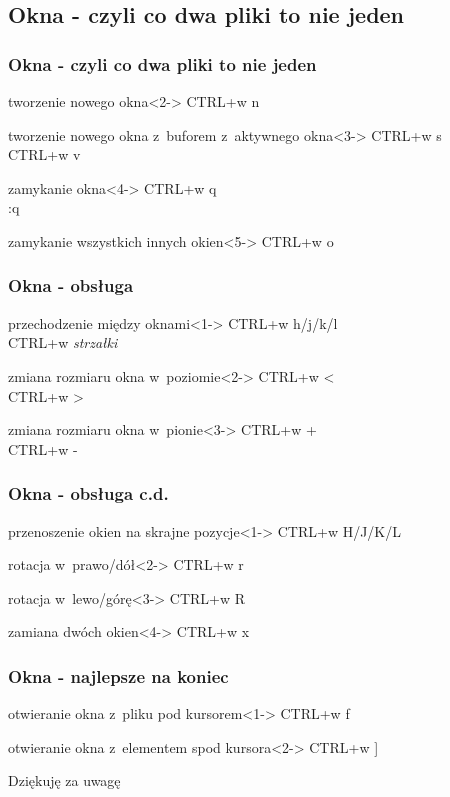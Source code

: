 \documentclass{beamer}
\begin{document}
\subsection{Okna - czyli co dwa pliki to nie jeden}
\begin{frame}
	\frametitle{Okna - czyli co dwa pliki to nie jeden}
	\begin{block}{tworzenie nowego okna}<2->
		CTRL+w n
	\end{block}
	\begin{block}{tworzenie nowego okna z~buforem z~aktywnego okna}<3->
		CTRL+w s\\
		CTRL+w v
	\end{block}
	\begin{block}{zamykanie okna}<4->
		CTRL+w q\\
		:q
	\end{block}
	\begin{block}{zamykanie wszystkich innych okien}<5->
		CTRL+w o
	\end{block}
\end{frame}
\begin{frame}
	\frametitle{Okna - obsługa}
	\begin{block}{przechodzenie między oknami}<1->
		CTRL+w h/j/k/l\\
		CTRL+w \textit{strzałki}
	\end{block}
	\begin{block}{zmiana rozmiaru okna w~poziomie}<2->
		CTRL+w \textless\\
		CTRL+w \textgreater
	\end{block}
	\begin{block}{zmiana rozmiaru okna w~pionie}<3->
		CTRL+w +\\
		CTRL+w -
	\end{block}
\end{frame}
\begin{frame}
	\frametitle{Okna - obsługa c.d.}
	\begin{block}{przenoszenie okien na skrajne pozycje}<1->
		CTRL+w H/J/K/L
	\end{block}
	\begin{block}{rotacja w~prawo/dół}<2->
		CTRL+w r
	\end{block}
	\begin{block}{rotacja w~lewo/górę}<3->
		CTRL+w R
	\end{block}
	\begin{block}{zamiana dwóch okien}<4->
		CTRL+w x
	\end{block}
\end{frame}
\begin{frame}
	\frametitle{Okna - najlepsze na koniec}
	\begin{block}{otwieranie okna z~pliku pod kursorem}<1->
	CTRL+w f
	\end{block}
	\begin{block}{otwieranie okna z~elementem spod kursora}<2->
	CTRL+w ]
	\end{block}
\end{frame}
\begin{frame}
	Dziękuję za uwagę
\end{frame}
\end{document}
